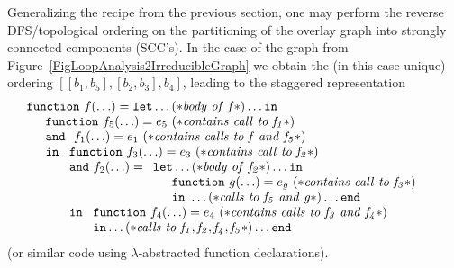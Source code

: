 Generalizing the recipe from the previous section, one may perform the
reverse DFS/topological ordering on the partitioning of the overlay
graph into strongly connected components (SCC's). In the case of the
graph from Figure~\ref{FigLoopAnalysis2IrreducibleGraph} we obtain the
(in this case unique) ordering $[[b_1,b_5], [b_2,b_3], b_4]$, leading
to the staggered representation
\begin{equation}
\label{FunctionalCascadeIrredFun}
\begin{array}{l}
  \mathtt{function}\ f (\ldots)= 
  \mathtt{let} \ldots (* \mathit{body\ of\ f}*)\ldots \mathtt{in}\\
  \quad \begin{array}{l}
          \mathtt{function}\ f_5(\ldots) = e_5\ 
               (* \mathit{contains\ call\ to\ f_1} *) \\ 
          \mathtt{and}\ \ f_1(\ldots) = e_1\ 
                 (* \mathit{contains\ calls\ to\ f\ and\ f_5}*) \\ 
          \mathtt{in}\ 
            \begin{array}[t]{l}
              \mathtt{function}\ f_3(\ldots) = e_3\   
                 (* \mathit{contains\ call\ to\ f_2} *) \\
              \mathtt{and}\ f_2(\ldots) =
                 \begin{array}[t]{l}
                    \mathtt{let} \ldots (* \mathit{body\ of\ f_2}*)\ldots
                      \mathtt{in}\\
                     \quad \begin{array}{l}
                        \mathtt{function}\ g(\ldots) = e_g\
                           (* \mathit{contains\ call\ to\ f_3}*)\\ 
                        \mathtt{in}\   \ldots 
                              (* \mathit{calls\ to\ f_5\ and\ g} *)
                        \ldots \mathtt{end}
                     \end{array}\\
                   \end{array}\\ \mathtt{in}\
                \begin{array}[t]{l}
                  \mathtt{function}\ f_4(\ldots) = e_4\
                    (* \mathit{contains\ calls\ to\ f_3\ and\ f_4}*) \\
                   \mathtt{in} \ldots 
                      (* \mathit{calls\ to\ f_1, f_2, f_4, f_5}*)
                   \ldots \mathtt{end}
                \end{array}
          \end{array}
        \end{array}
  \end{array}
\end{equation}
(or similar code using $\lambda$-abstracted function declarations).

